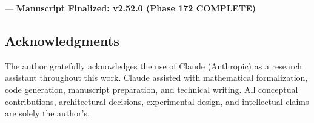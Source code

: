 ---
\textbf{Manuscript Finalized: v2.52.0 (Phase 172 COMPLETE)}

\subsection{Acknow\-ledgments}

The author gratefully ackno\-wledges the use of Claude (Anthropic) as a research assistant throughout this work. Claude assisted with mathe\-matical forma\-lization, code generation, manuscript preparation, and technical writing. All conceptual contr\-ibutions, archi\-tectural decisions, exper\-imental design, and intel\-lectual claims are solely the author's.

